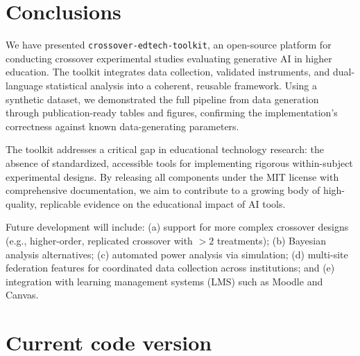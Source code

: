 \documentclass[authoryear,preprint,review,12pt]{elsarticle}
\begin{document}
\section{Conclusions}
\label{sec:conclusions}

We have presented \texttt{crossover-edtech-toolkit}, an open-source platform
for conducting crossover experimental studies evaluating generative AI in
higher education. The toolkit integrates data collection, validated
instruments, and dual-language statistical analysis into a coherent,
reusable framework. Using a synthetic dataset, we demonstrated the full
pipeline from data generation through publication-ready tables and
figures, confirming the implementation's correctness against known
data-generating parameters.

The toolkit addresses a critical gap in educational technology research:
the absence of standardized, accessible tools for implementing rigorous
within-subject experimental designs. By releasing all components under
the MIT license with comprehensive documentation, we aim to contribute
to a growing body of high-quality, replicable evidence on the educational
impact of AI tools.

Future development will include: (a) support for more complex crossover
designs (e.g., higher-order, replicated crossover with $> 2$ treatments);
(b) Bayesian analysis alternatives; (c) automated power analysis via
simulation; (d) multi-site federation features for coordinated data
collection across institutions; and (e) integration with learning
management systems (LMS) such as Moodle and Canvas.


\section*{Current code version}
\end{document}
